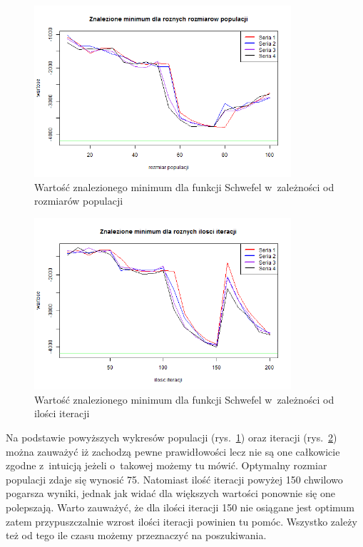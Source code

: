 \documentclass[11pt, a4paper]{article}
\newcommand{\fbi}{\leavevmode{\parindent=1em\indent}}
\begin{document}
\begin{figure}[H]
	\begin{center}
		\includegraphics[width=0.85\textwidth]{./assets/Schwefel4.png}
		\caption{Wartość znalezionego minimum dla funkcji Schwefel w~zależności od rozmiarów populacji}
		\label{fig:schwefel4}
	\end{center}
\end{figure}

\begin{figure}[H]
	\begin{center}
		\includegraphics[width=0.85\textwidth]{./assets/Schwefel5.png}
		\caption{Wartość znalezionego minimum dla funkcji Schwefel w~zależności od ilości iteracji}
		\label{fig:schwefel5}
	\end{center}
\end{figure}

\fbi
Na podstawie powyższych wykresów populacji (rys.~\ref{fig:schwefel4}) oraz iteracji (rys.~\ref{fig:schwefel5}) można zauważyć iż zachodzą pewne prawidłowości lecz nie są one całkowicie zgodne z~intuicją jeżeli o~takowej możemy tu mówić. Optymalny rozmiar populacji zdaje się wynosić 75. Natomiast ilość iteracji powyżej 150 chwilowo pogarsza wyniki, jednak jak widać dla większych wartości ponownie się one polepszają. Warto zauważyć, że dla ilości iteracji 150 nie osiągane jest optimum zatem przypuszczalnie wzrost ilości iteracji powinien tu pomóc. Wszystko zależy też od tego ile czasu możemy przeznaczyć na poszukiwania.
\end{document}
